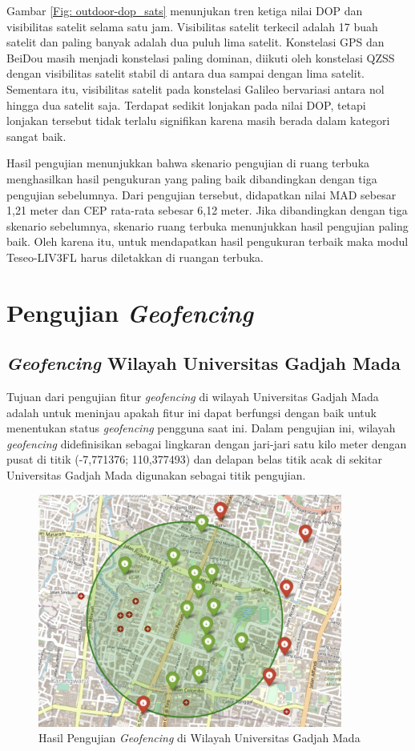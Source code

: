 Gambar \ref{Fig: outdoor-dop_sats} menunjukan tren ketiga nilai DOP dan visibilitas satelit selama satu jam. Visibilitas satelit terkecil adalah 17 buah satelit dan paling banyak adalah dua puluh lima satelit. Konstelasi GPS dan BeiDou masih menjadi konstelasi paling dominan, diikuti oleh konstelasi QZSS dengan visibilitas satelit stabil di antara dua sampai dengan lima satelit. Sementara itu, visibilitas satelit pada konstelasi Galileo bervariasi antara nol hingga dua satelit saja. Terdapat sedikit lonjakan pada nilai DOP, tetapi lonjakan tersebut tidak terlalu signifikan karena masih berada dalam kategori sangat baik.

Hasil pengujian menunjukkan bahwa skenario pengujian di ruang terbuka menghasilkan hasil pengukuran yang paling baik dibandingkan dengan tiga pengujian sebelumnya. Dari pengujian tersebut, didapatkan nilai MAD sebesar 1,21 meter dan CEP rata-rata sebesar 6,12 meter. Jika dibandingkan dengan tiga skenario sebelumnya, skenario ruang terbuka menunjukkan hasil pengujian paling baik. Oleh karena itu, untuk mendapatkan hasil pengukuran terbaik maka modul Teseo\hyp{}LIV3FL harus diletakkan di ruangan terbuka.

\section{Pengujian \textit{Geofencing}}
\subsection{\textit{Geofencing} Wilayah Universitas Gadjah Mada}
Tujuan dari pengujian fitur \textit{geofencing} di wilayah Universitas Gadjah Mada adalah untuk meninjau apakah fitur ini dapat berfungsi dengan baik untuk menentukan status \textit{geofencing} pengguna saat ini. Dalam pengujian ini, wilayah \textit{geofencing} didefinisikan sebagai lingkaran dengan jari-jari satu kilo meter dengan pusat di titik (-7,771376; 110,377493) dan delapan belas titik acak di sekitar Universitas Gadjah Mada digunakan sebagai titik pengujian.

\begin{figure}[H]
	\centering
	\includegraphics[width=10cm]{contents/chapter-4/geofencing/wilayah-ugm.jpg}
	\caption{Hasil Pengujian \textit{Geofencing} di Wilayah Universitas Gadjah Mada}
	\label{Fig: geofencing-1}
\end{figure}

